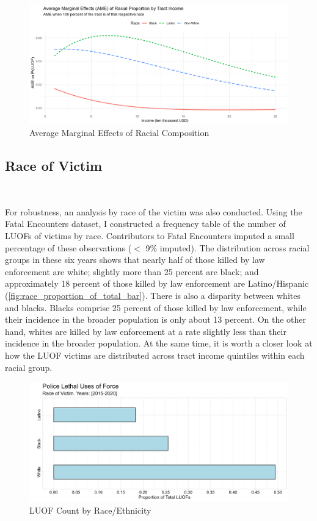 \documentclass[12pt]{article}
\begin{document}
\begin{figure}[H]
  \centering
  \includegraphics[width=\linewidth]{images/ame_race_by_income}
  \captionsetup{justification=centering, singlelinecheck=false, margin=2cm}
  \caption{Average Marginal Effects of Racial Composition}
  \label{fig:ame_race_by_income}
\end{figure}

\subsection{Race of Victim}\

For robustness, an analysis by race of the victim was also conducted. Using the Fatal Encounters dataset, I constructed a frequency table of the number of LUOFs of victims by race. Contributors to Fatal Encounters imputed a small percentage of these observations ($<$ 9\% imputed). The distribution across racial groups in these six years shows that nearly half of those killed by law enforcement are white; slightly more than 25 percent are black; and approximately 18 percent of those killed by law enforcement are Latino/Hispanic (\autoref{fig:race_proportion_of_total_bar}). There is also a disparity between whites and blacks. Blacks comprise 25 percent of those killed by law enforcement, while their incidence in the broader population is only about 13 percent. On the other hand, whites are killed by law enforcement at a rate slightly less than their incidence in the broader population. At the same time, it is worth a closer look at how the LUOF victims are distributed across tract income quintiles within each racial group.

\begin{figure}[H]
  \centering
  \includegraphics[width=\linewidth]{images/race_proportion_of_total_bar}
  \captionsetup{justification=centering, singlelinecheck=false, margin=2cm}
  \caption{LUOF Count by Race/Ethnicity}
  \label{fig:race_proportion_of_total_bar}
\end{figure}
\end{document}
